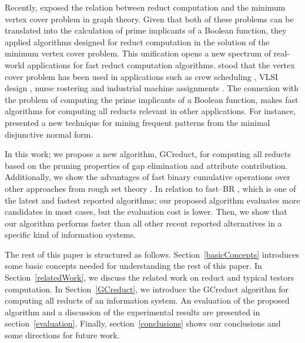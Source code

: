 \documentclass[authoryear,preprint,review,12pt]{elsarticle}
\begin{document}
  Recently, \cite{chen2015} exposed the relation between reduct computation and the minimum vertex cover
  problem in graph theory. Given that both of these problems can be translated into the calculation of
  prime implicants of a Boolean function, they applied algorithms designed for reduct computation in the
  solution of the minimum vertex cover problem. This unification opens a new spectrum of real-world applications
  for fast reduct computation algorithms. \cite{chen2015} stood that the vertex cover problem has been used in applications such as crew scheduling \citep{Sherali1984}, VLSI design \citep{Bhattacharyya2000}, nurse rostering \citep{Caprara1998} and industrial machine assignments \citep{Woodyatt1993}. The connexion with the problem of computing the prime implicants of a Boolean function, makes fast algorithms for computing all reducts relevant in other applications. For instance, \cite{Li2015} presented a new technique for mining frequent patterns from the minimal disjunctive normal form.



  In this work; we propose a new algorithm, GCreduct, for computing all reducts based on the pruning properties of gap elimination and attribute contribution. Additionally, we show the advantages of fast binary cumulative operations \citep{Sanchez10,Lias13} over other approaches from rough set theory \citep{WangP07,Jensen14}. In relation to fast--BR \citep{Lias13}, which is one of the latest and fastest reported algorithms; our proposed algorithm evaluates more candidates in most cases, but the evaluation cost is lower. Then, we show that our algorithm performs faster than all other recent reported alternatives in a specific kind of information systems. 
  
  
  The rest of this paper is structured as follows. Section~\ref{basicConcepts}  introduces some basic concepts needed for understanding the rest of this paper. In Section~\ref{relatedWork}, we discuss the related work on reduct and typical testors computation.  In Section~\ref{GCreduct}, we introduce the GCreduct algorithm for computing all reducts of an information system. An evaluation of the proposed algorithm and a discussion of the experimental results are presented in section~\ref{evaluation}. Finally, section~\ref{conclusions} shows our conclusions and some directions for future work.
   
\end{document}
